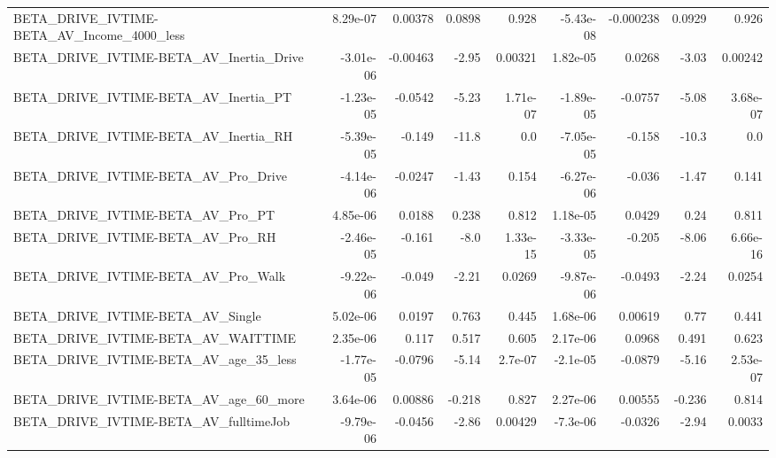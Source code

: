 \begin{tabular}{lrrrrrrrr}
BETA\_DRIVE\_IVTIME-BETA\_AV\_Income\_4000\_less         &    8.29e-07 &      0.00378 &   0.0898 &    0.928 &  -5.43e-08 &   -0.000238 &       0.0929 &         0.926 \\
BETA\_DRIVE\_IVTIME-BETA\_AV\_Inertia\_Drive            &   -3.01e-06 &     -0.00463 &    -2.95 &  0.00321 &   1.82e-05 &      0.0268 &        -3.03 &       0.00242 \\
BETA\_DRIVE\_IVTIME-BETA\_AV\_Inertia\_PT               &   -1.23e-05 &      -0.0542 &    -5.23 & 1.71e-07 &  -1.89e-05 &     -0.0757 &        -5.08 &      3.68e-07 \\
BETA\_DRIVE\_IVTIME-BETA\_AV\_Inertia\_RH               &   -5.39e-05 &       -0.149 &    -11.8 &      0.0 &  -7.05e-05 &      -0.158 &        -10.3 &           0.0 \\
BETA\_DRIVE\_IVTIME-BETA\_AV\_Pro\_Drive                &   -4.14e-06 &      -0.0247 &    -1.43 &    0.154 &  -6.27e-06 &      -0.036 &        -1.47 &         0.141 \\
BETA\_DRIVE\_IVTIME-BETA\_AV\_Pro\_PT                   &    4.85e-06 &       0.0188 &    0.238 &    0.812 &   1.18e-05 &      0.0429 &         0.24 &         0.811 \\
BETA\_DRIVE\_IVTIME-BETA\_AV\_Pro\_RH                   &   -2.46e-05 &       -0.161 &     -8.0 & 1.33e-15 &  -3.33e-05 &      -0.205 &        -8.06 &      6.66e-16 \\
BETA\_DRIVE\_IVTIME-BETA\_AV\_Pro\_Walk                 &   -9.22e-06 &       -0.049 &    -2.21 &   0.0269 &  -9.87e-06 &     -0.0493 &        -2.24 &        0.0254 \\
BETA\_DRIVE\_IVTIME-BETA\_AV\_Single                   &    5.02e-06 &       0.0197 &    0.763 &    0.445 &   1.68e-06 &     0.00619 &         0.77 &         0.441 \\
BETA\_DRIVE\_IVTIME-BETA\_AV\_WAITTIME                 &    2.35e-06 &        0.117 &    0.517 &    0.605 &   2.17e-06 &      0.0968 &        0.491 &         0.623 \\
BETA\_DRIVE\_IVTIME-BETA\_AV\_age\_35\_less              &   -1.77e-05 &      -0.0796 &    -5.14 &  2.7e-07 &   -2.1e-05 &     -0.0879 &        -5.16 &      2.53e-07 \\
BETA\_DRIVE\_IVTIME-BETA\_AV\_age\_60\_more              &    3.64e-06 &      0.00886 &   -0.218 &    0.827 &   2.27e-06 &     0.00555 &       -0.236 &         0.814 \\
BETA\_DRIVE\_IVTIME-BETA\_AV\_fulltimeJob              &   -9.79e-06 &      -0.0456 &    -2.86 &  0.00429 &   -7.3e-06 &     -0.0326 &        -2.94 &        0.0033 \\

\end{tabular}
